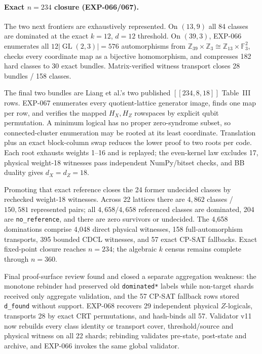 \documentclass[11pt]{article}
\newcommand{\nk}[1]{[\![#1]\!]}
\theoremstyle{plain}
\theoremstyle{remark}
\begin{document}
\paragraph{Exact $n=234$ closure (EXP-066/067).}
The two next frontiers are exhaustively represented. On $(13,9)$ all 84
classes are dominated at the exact $k=12$, $d=12$ threshold. On $(39,3)$,
EXP-066 enumerates all
$12\lvert\operatorname{GL}(2,3)\rvert=576$ automorphisms from
$\mathbb Z_{39}\times\mathbb Z_3\cong
\mathbb Z_{13}\times\mathbb F_3^2$, checks every coordinate map as a
bijective homomorphism, and compresses 182 hard classes to 30 exact bundles.
Matrix-verified witness transport closes 28 bundles / 158 classes.

The final two bundles are Liang et al.'s two published $\nk{234,8,18}$
Table~III rows. EXP-067 enumerates every quotient-lattice generator image,
finds one map per row, and verifies the mapped $H_X,H_Z$ rowspaces by explicit
qubit permutation. A minimum logical has no proper zero-syndrome subset, so
connected-cluster enumeration may be rooted at its least coordinate.
Translation plus an exact block-column swap reduces the lower proof to two
roots per code. Each root exhausts weights 1--16 and is replayed; the
even-kernel law excludes 17, physical weight-18 witnesses pass independent
NumPy/bitset checks, and BB duality gives $d_X=d_Z=18$.

Promoting that exact reference closes the 24 former undecided classes by
rechecked weight-18 witnesses. Across 22 lattices there are $4{,}862$ classes /
$150{,}581$ represented pairs; all $4{,}658/4{,}658$ referenced classes are
dominated, 204 are \texttt{no\_reference}, and there are zero survivors or
undecided. The 4,658 dominations comprise 4,048 direct physical witnesses, 158
full-automorphism transports, 395 bounded CDCL witnesses, and 57 exact CP-SAT
fallbacks. Exact fixed-point closure reaches $n=234$; the algebraic $k$ census
remains complete through $n=360$.

Final proof-surface review found and closed a separate aggregation weakness:
the monotone rebinder had preserved old \texttt{dominated*} labels while
non-target shards received only aggregate validation, and the 57 CP-SAT
fallback rows stored \texttt{d\_found} without support. EXP-068 recovers 29
independent physical $Z$-logicals, transports 28 by exact CRT permutations,
and hash-binds all 57. Validator v11 now rebuilds every class identity or
transport cover, threshold/source and physical witness on all 22 shards;
rebinding validates pre-state, post-state and archive, and EXP-066 invokes the
same global validator.
\end{document}
